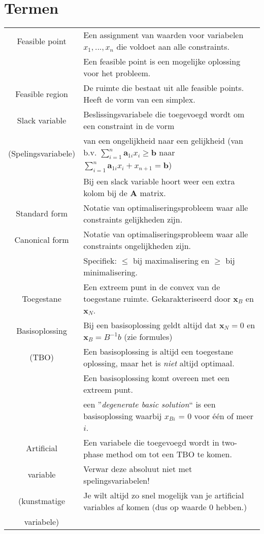 \documentclass[10pt,a4paper]{article}
\begin{document}
\section*{Termen}
\begin{tabular}{|c|l|}
\hline
Feasible point & Een assignment van waarden voor variabelen $x_1, ..., x_n$ die voldoet aan alle constraints. \\ 
& Een feasible point is een mogelijke oplossing voor het probleem.\\
\hline
Feasible region & De ruimte die bestaat uit alle feasible points. Heeft de vorm van een simplex. \\
\hline
Slack variable & Beslissingsvariabele die toegevoegd wordt om een constraint in de vorm \\
(Spelingsvariabele) & van een ongelijkheid naar een gelijkheid (van b.v. $\displaystyle\sum\limits_{i = 1}^n \textbf{a}_{1i}x_i \geq \textbf{b}$ naar $\displaystyle\sum\limits_{i = 1}^n \textbf{a}_{1i}x_i + x_{n + 1} = \textbf{b}$) \\
& Bij een slack variable hoort weer een extra kolom bij de $\textbf{A}$ matrix. \\
\hline
Standard form & Notatie van optimaliseringsprobleem waar alle constraints gelijkheden zijn.\\
\hline
Canonical form & Notatie van optimaliseringsprobleem waar alle constraints ongelijkheden zijn.\\
 & Specifiek: $\le$ bij maximalisering en $\geq$ bij minimalisering. \\
\hline
Toegestane & Een extreem punt in de convex van de toegestane ruimte. Gekarakteriseerd door $\textbf{x}_B$ en $\textbf{x}_N$. \\
Basisoplossing & Bij een basisoplossing geldt altijd dat $\textbf{x}_N = 0$ en $\textbf{x}_B = B^{-1}b$ (zie formules) \\
(TBO) & Een basisoplossing is altijd een toegestane oplossing, maar het is \textit{niet} altijd optimaal. \\
 & Een basisoplossing komt overeen met een extreem punt. \\
 & een ''\textit{degenerate basic solution}`` is een basisoplossing waarbij $x_{Bi}$ = 0 voor één of meer $i$. \\
\hline
Artificial & Een variabele die toegevoegd wordt in two-phase method om tot een TBO te komen. \\
variable & Verwar deze absoluut niet met spelingsvariabelen! \\
(kunstmatige & Je wilt altijd zo snel mogelijk van je artificial variables af komen (dus op waarde 0 hebben.) \\
variabele) & \\
\hline
\end{tabular} 
\end{document}
